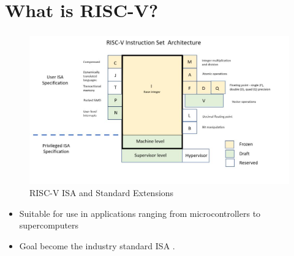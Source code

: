 \documentclass{eceday}
\begin{document}
\section{What is RISC-V?}\label{sec:What_is_RISC-V}
\begin{frame}
  \frametitle{}
  \begin{figure}[h!tbp]
    \centering
    \includegraphics[scale=0.35]{./RISC-V-ISA_and_Extensions.jpg}
    \caption{RISC-V ISA and Standard Extensions \parencite{customRISCVProcessor}}
    \label{fig:RISC-V_ISA-Standard_Extensions}
  \end{figure}
  \vspace{-1.5em}
  \begin{itemize}
  	\item Suitable for use in applications ranging from microcontrollers to supercomputers
  	\item Goal \textrightarrow{} become the industry standard ISA \parencite{FireSimTalk1}.
  \end{itemize}
\end{frame}
\end{document}
